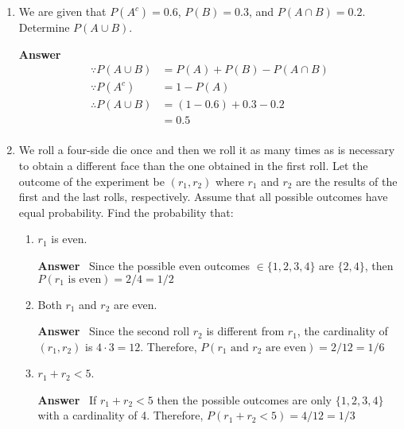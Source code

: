 \documentclass[paper=usletter, fontsize=12pt]{article}
\newcommand{\ans}{\textbf{Answer} \ }
\begin{document}
\begin{enumerate}
        \item We are given that $P(A^c) = 0.6$, $P(B) = 0.3$, and $P(A \cap B)
        = 0.2$. Determine $P(A \cup B)$.

        \ans
        \vspace{-0.4in}
        \begin{align*}
            \because P(A \cup B) & = P(A) + P(B) - P(A \cap B) \\
            \because P(A^c) & = 1 - P(A) \\
            \therefore P(A \cup B) & = (1 - 0.6) + 0.3 - 0.2 \\
            & = 0.5 \\
        \end{align*}

        \vspace{-0.4in}
        \item We roll a four-side die once and then we roll it as many times as
        is necessary to obtain a different face than the one obtained in the
        first roll. Let the outcome of the experiment be $(r_1, r_2)$ where
        $r_1$ and $r_2$ are the results of the first and the last rolls,
        respectively. Assume that all possible outcomes have equal probability.
        Find the probability that:

            \begin{enumerate}

                \item $r_1$ is even.

                \ans Since the possible even outcomes $\in \{1, 2, 3, 4\}$ are
                $\{2, 4\}$, then $P(\text{$r_1$ is even}) = 2/4 = 1/2$

                \item Both $r_1$ and $r_2$ are even.

                \ans Since the second roll $r_2$ is different from $r_1$, the
                cardinality of $(r_1, r_2)$ is $4 \cdot 3 = 12$. Therefore,
                $P(\text{$r_1$ and $r_2$ are even}) = 2/12 = 1/6$

                \item $r_1 + r_2 < 5$.

                \ans If $r_1 + r_2 < 5$ then the possible outcomes are only
                $\{1, 2, 3, 4\}$ with a cardinality of 4. Therefore, $P(r_1 +
                r_2 < 5) = 4/12 = 1/3$

            \end{enumerate}


\end{enumerate}
\end{document}
